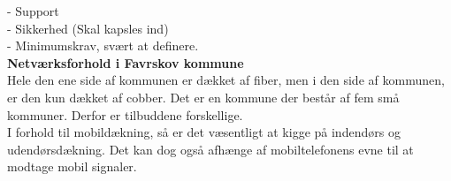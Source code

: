- Support\\
- Sikkerhed (Skal kapsles ind)\\
- Minimumskrav, svært at definere.\\ 
\textbf{Netværksforhold i Favrskov kommune}\\
Hele den ene side af kommunen er dækket af fiber, men i den side af kommunen, er den kun dækket af cobber. Det er en kommune der består af fem små kommuner. Derfor er tilbuddene forskellige.\\
I forhold til mobildækning, så er det væsentligt at kigge på indendørs og udendørsdækning. Det kan dog også afhænge af mobiltelefonens evne til at modtage mobil signaler.\\